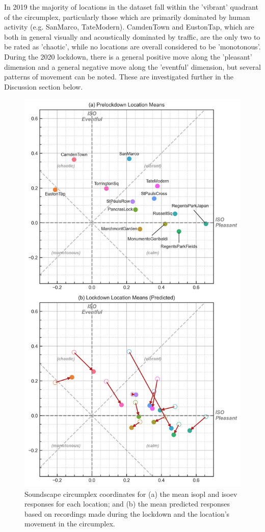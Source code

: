    In 2019 the majority of locations in the dataset fall within the 'vibrant' quadrant of the circumplex, particularly those which are primarily dominated by human activity (e.g. SanMarco, TateModern). CamdenTown and EustonTap, which are both in general visually and acoustically dominated by traffic, are the only two to be rated as 'chaotic', while no locations are overall considered to be 'monotonous'. During the 2020 lockdown, there is a general positive move along the 'pleasant' dimension and a general negative move along the 'eventful' dimension, but several patterns of movement can be noted. These are investigated further in the Discussion section below.

   \begin{figure}[h!]
     \caption{Soundscape circumplex coordinates for (a) the mean \gls{isopl} and \gls{isoev} responses for each location; and (b) the mean predicted responses based on recordings made during the lockdown and the location's movement in the circumplex. \label{fig:circumplex-locations}}
     \centering
     \includegraphics[width=.75\textwidth]{Figures/Lockdown Figure5.jpg}
   \end{figure}

